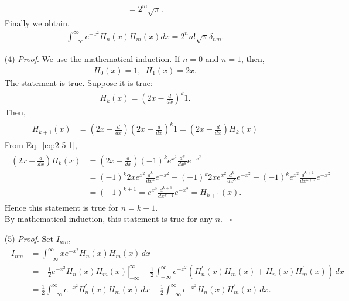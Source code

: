 \documentclass[floatfix,nofootinbib,superscriptaddress,fleqn]{revtex4-2}
\begin{document}
\begin{itemize}
\begin{align*}
  =2^m\sqrt{\pi}.
\end{align*}
Finally we obtain,
\begin{align}\label{eq:2-7}
  \int_{-\infty}^\infty e^{-x^2} H_n(x) H_m(x) dx = 2^nn! \sqrt{\pi}
   \delta_{nm}.
\end{align}
\item[(4)] {\it Proof}. We use the mathematical induction. 
If $n=0$ and $n=1$, then,
\begin{align*}
  H_0(x) = 1,\,\,\,H_1(x)=2x. 
\end{align*}
The statement is true. Suppose it is true:
\begin{align*}
  H_k(x) = \left(2x-\frac{d}{dx}\right)^k 1.
\end{align*}
Then,
\begin{align*}
  \begin{split}
    H_{k+1}(x) &= \left(2x-\frac{d}{dx}\right)\left(2x-\frac{d}{dx}\right)^k 1
    =\left(2x-\frac{d}{dx}\right)H_k(x)
  \end{split}
\end{align*}
From Eq.~\eqref{eq:2-5-1},
\begin{align*}
  \begin{split}
    \left(2x-\frac{d}{dx}\right)H_k(x)
    &=\left(2x-\frac{d}{dx}\right)(-1)^ke^{x^2}\frac{d^k}{dx^k}e^{-x^2}  \\
    &=(-1)^k 2x e^{x^2}\frac{d^k}{dx^k}e^{-x^2}
    -(-1)^k 2x e^{x^2}\frac{d^k}{dx^k}e^{-x^2}
    -(-1)^k e^{x^2}\frac{d^{k+1}}{dx^{k+1}}e^{-x^2}  \\
    &=(-1)^{k+1}= e^{x^2}\frac{d^{k+1}}{dx^{k+1}}e^{-x^2}
    =H_{k+1}(x).
  \end{split}
\end{align*}
Hence this statement is true for $n=k+1$. \\
By mathematical induction, 
this statement is true for any $n$. ~\hfill $\square$
\item[(5)] {\it Proof}. Set $I_{nm}$,
\begin{align*}
  \begin{split}
    I_{nm} &= \int_{-\infty}^\infty xe^{-x^2}H_n(x)H_m(x) \,dx  \\
    &=-\left.\frac{1}{2}e^{-x^2}H_n(x)H_m(x)\right|_{-\infty}^\infty
    +\frac{1}{2}\int_{-\infty}^\infty 
    e^{-x^2}\left(H^\prime_n(x)H_m(x)+H_n(x)H^\prime_m(x)\right) \,dx \\
    &=\frac{1}{2}\int_{-\infty}^\infty 
    e^{-x^2}H^\prime_n(x)H_m(x) \,dx+
    \frac{1}{2}\int_{-\infty}^\infty 
    e^{-x^2}H_n(x)H^\prime_m(x) \,dx.

\end{split}
\end{align*}
\end{itemize}
\end{document}
